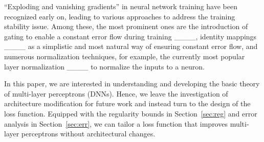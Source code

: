 ``Exploding and vanishing gradients'' in neural network training have been recognized early
on, leading to various approaches to address the training stability issue. Among these, the
most prominent ones are the introduction of gating to enable a constant error flow
during training ____, identity mappings ____
as a simplistic and most natural way of ensuring constant error flow, and numerous normalization
techniques, for example, the currently most popular layer normalization ____ to normalize the
inputs to a neuron.

In this paper, we are interested in understanding and developing the basic theory of multi-layer perceptrons (DNNs). Hence, we leave the investigation
of architecture modification for future work and instead turn to the design of the loss function.
Equipped with the regularity bounds in Section~\ref{sec:reg} and error analysis in Section~\ref{sec:err},
we can tailor a loss function that improves multi-layer perceptrons without architectural changes.